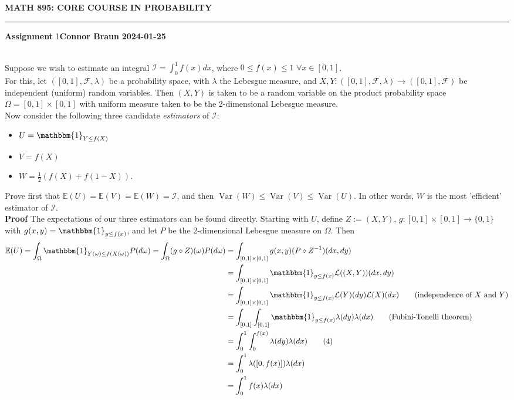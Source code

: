 \documentclass[10pt]{article}
\newcommand{\E}{\mathbb{E}}
\newcommand{\1}[1]{\mathbbm{1}_{#1}}
\newcommand{\mc}[1]{\mathcal{#1}}
\DeclareMathOperator{\Var}{Var}
\begin{document}
    \begin{center}
        {\bf\large{MATH 895: CORE COURSE IN PROBABILITY}}
        \smallskip
        \hrule
        \smallskip
        {\bf Assignment} 1\hfill {\bf Connor Braun} \hfill {\bf 2024-01-25}
    \end{center}
    \\[5pt]
    Suppose we wish to estimate an integral $\mc{I}=\int_0^1f(x)dx$, where $0\leq f(x)\leq 1$ $\forall x\in[0,1]$. \\[5pt]
    For this, let $([0,1],\mc{F},\lambda)$ be a probability space, with $\lambda$ the Lebesgue measure, and $X,Y:([0,1],\mc{F},\lambda)\rightarrow([0,1],\mc{F})$ be independent
    (uniform) random variables. Then $(X,Y)$ is taken to be a random variable on the product probability space $\Omega=[0,1]\times[0,1]$ with uniform measure taken to be
    the 2-dimensional Lebesgue measure.\\[5pt]
    Now consider the following three candidate {\it estimators} of $\mc{I}$:
    \begin{itemize}
        \item $U=\1{Y\leq f(X)}$
        \item $V=f(X)$
        \item $W=\frac{1}{2}(f(X)+f(1-X))$.
    \end{itemize}
    Prove first that $\E(U)=\E(V)=\E(W)=\mc{I}$, and then $\Var(W)\leq\Var(V)\leq \Var(U)$. In other words, $W$ is the most 'efficient' estimator of $\mc{I}$.\\[5pt]
    {\bf Proof}\hspace{5pt} The expectations of our three estimators can be found directly. Starting with $U$, define $Z:=(X,Y)$, $g:[0,1]\times[0,1]\rightarrow\{0,1\}$ with $g(x,y)=\1{y\leq f(x)}$, and let $P$ be the 2-dimensional Lebesgue measure on $\Omega$. Then
    \begin{align*}
        \E(U)=\int_\Omega\1{Y(\omega)\leq f(X(\omega))}P(d\omega)=\int_\Omega (g\circ Z)(\omega)P(d\omega)&=\int_{[0,1]\times[0,1]}g(x,y)(P\circ Z^{-1})(dx, dy)\\
        &=\int_{[0,1]\times[0,1]}\1{y\leq f(x)}\mc{L}((X,Y))(dx, dy)\\
        &=\int_{[0,1]\times[0,1]}\1{y\leq f(x)}\mc{L}(Y)(dy)\mc{L}(X)(dx)\tag{independence of $X$ and $Y$}\\
        &=\int_{[0,1]}\int_{[0,1]}\1{y\leq f(x)}\lambda(dy)\lambda(dx)\tag{Fubini-Tonelli theorem}\\
        &=\int_0^1\int_0^{f(x)}\lambda(dy)\lambda(dx)\tag{4}\\
        &=\int_{0}^1\lambda([0,f(x)])\lambda(dx)\\
        &=\int_0^1f(x)\lambda(dx)
    \end{align*}
\end{document}
